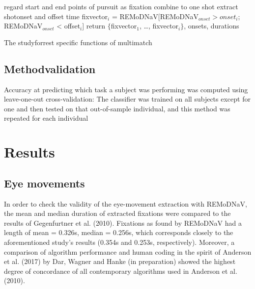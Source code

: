 \documentclass[a4paper, 12pt]{scrreprt}
\begin{document}
\begin{algorithm}
	
	{
		{
			regard start and end points of pursuit as fixation
		}
	}
	{
	}
	{
		{combine to one shot}
	}
	{
		{extract shotonset and offset time}
	}
	{fixvector$_i$ = REMoDNaV[REMoDNaV$_{onset} > onset_i$; REMoDNaV$_{onset}$ < offset$_i$]
	}
	return $\{$fixvector$_1$, \ldots, fixvector$_i$$\}$, onsets, durations
	\caption{The studyforrest specific functions of multimatch}
	\label{algo:multimatch_forrest}
\end{algorithm}


\section{Methodvalidation}\label{section:methodvalidation}


Accuracy at predicting which task a subject was performing was computed using leave-one-out cross-validation: The classifier was trained on all subjects except for one and then
tested on that out-of-sample individual, and this method was repeated for each individual




\chapter{Results}

\section{Eye movements}
In order to check the validity of the eye-movement extraction with REMoDNaV, the mean and median duration of extracted fixations were compared to the results of Gegenfurtner et al. (2010). Fixations as found by REMoDNaV had a length of mean = 0.326s, median = 0.256s, which corresponds closely to the aforementioned study's results (0.354s and 0.253s, respectively). Moreover, a comparison of algorithm performance and human coding in the spirit of Anderson et al. (2017) by Dar, Wagner and Hanke (in preparation) showed the highest degree of concordance of all contemporary algorithms used in Anderson et al. (2010).
\end{document}
